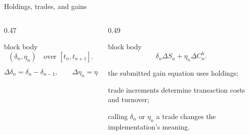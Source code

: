 \begin{frame}[t]{Holdings, trades, and gains}
  \begin{columns}[T,onlytextwidth]
    \begin{column}{0.47\textwidth}
      \begin{beamercolorbox}[rounded=true,sep=0.18cm]{block body}
        \[ (\delta_n,\eta_n)\quad\text{over }[t_n,t_{n+1}]. \]
      \end{beamercolorbox}
      \vspace{0.16cm}
      \[
        \Delta\delta_n=\delta_n-\delta_{n-1},\qquad
        \Delta\eta_n=\eta_n-\eta_{n-1}.
      \]
    \end{column}
    \begin{column}{0.49\textwidth}
      \begin{beamercolorbox}[rounded=true,sep=0.18cm]{block body}
        \[ \delta_n\Delta S_n+\eta_n\Delta C_n^h. \]
      \end{beamercolorbox}
      \vspace{0.16cm}
      {\small\begin{tightitemize}
        \item the submitted gain equation uses holdings;
        \item trade increments determine transaction costs and turnover;
        \item calling \(\delta_n\) or \(\eta_n\) a trade changes the implementation's meaning.
      \end{tightitemize}}
    \end{column}
  \end{columns}
\end{frame}

